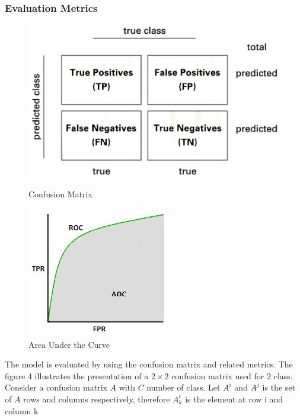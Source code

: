 \documentclass[sensors,article,submit,pdftex,moreauthors]{Definitions/mdpi}
\begin{document}
\subsubsection{Evaluation Metrics}
\begin{figure}[!htb]
	\begin{minipage}{0.48\textwidth}
		\centering
		\includegraphics[width=1.1\linewidth]{Definitions/Confusion-matrix}
		\caption{Confusion Matrix}\label{fig:confusion-matrix}
	\end{minipage}\hfill
	\begin{minipage}{0.48\textwidth}
		\centering
		\includegraphics[width=.7\linewidth]{Definitions/AUC}
		\caption{Area Under the Curve}\label{fig:AUC}
	\end{minipage}
\end{figure}
The model is evaluated by using the confusion matrix and related metrics. The figure 4 illustrates the presentation of a $2 \times 2$ confusion matrix used for $2$ class. Consider a confusion matrix $A$ with $C$ number of class. Let $A^i$ and $A^j$ is the set of $A$ rows and columns respectively, therefore $A^i_k$ is the element at row i and column k
\end{document}
